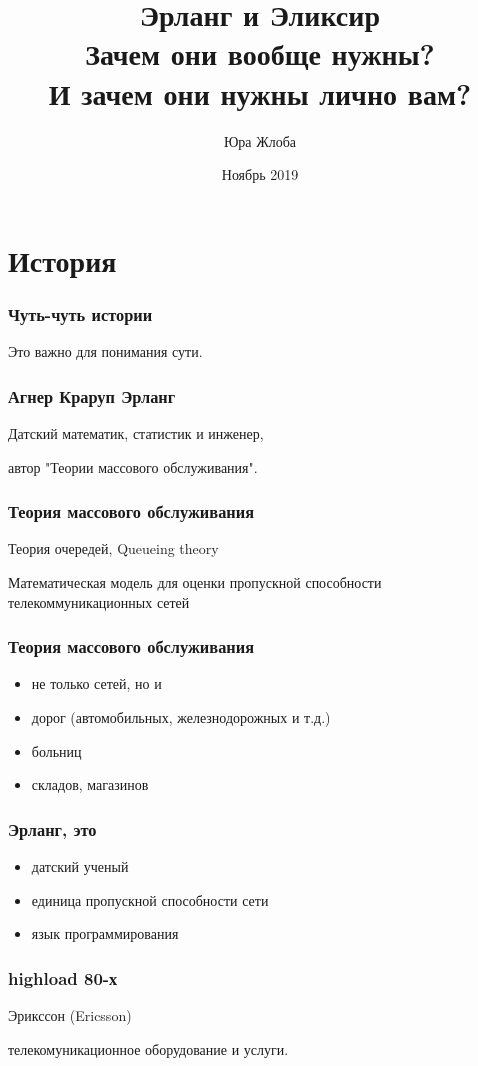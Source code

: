 \documentclass[10pt]{beamer}
\title{Эрланг и Эликсир \\
  \large Зачем они вообще нужны? \\
  И зачем они нужны лично вам?}
\author{Юра Жлоба}
\institute{Wargaming.net}
\date{Ноябрь 2019}
\begin{document}
\maketitle

\section{История}

\begin{frame}
\frametitle{Чуть-чуть истории}
\centering
Это важно для понимания сути.
\end{frame}

\begin{frame}
\frametitle{Агнер Краруп Эрланг}
\centering
Датский математик, статистик и инженер,
\par \bigskip
автор "Теории массового обслуживания".
\end{frame}

\begin{frame}
\frametitle{Теория массового обслуживания}
\par \bigskip
Теория очередей, Queueing theory
\par \bigskip
Математическая модель для оценки пропускной способности телекоммуникационных сетей
\end{frame}

\begin{frame}
\frametitle{Теория массового обслуживания}
\begin{itemize}
\item не только сетей, но и
\item дорог (автомобильных, железнодорожных и т.д.)
\item больниц
\item складов, магазинов
\end{itemize}
\end{frame}

\begin{frame}
\frametitle{Эрланг, это}
\begin{itemize}
\item датский ученый
\item единица пропускной способности сети
\item язык программирования
\end{itemize}
\end{frame}

\begin{frame}
\frametitle{highload 80-х}
\centering
Эрикссон (Ericsson)
\par \bigskip
телекомуникационное оборудование и услуги.
\end{frame}
\end{document}
